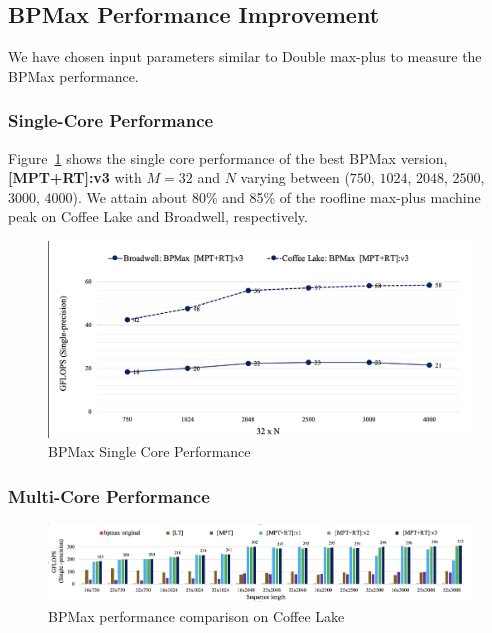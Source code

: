 \subsection{BPMax Performance Improvement}
We have chosen input parameters similar to Double max-plus to measure the BPMax performance.

\subsubsection{Single-Core Performance}
Figure~\ref{fig:st_performance_analysis_bpmax} shows the single core performance of the best BPMax version, \textbf{[MPT+RT]:v3} with $M=32$ and $N$ varying between ($750$, $1024$, $2048$, $2500$, $3000$, $4000$). We attain about 80\% and 85\% of the roofline max-plus machine peak on Coffee Lake and Broadwell, respectively.
\begin{figure}[htbp]
\centerline{\includegraphics[scale=0.38, trim=5 5 5 5,clip]{content/figures/bpmax_single_core.png}}
\caption{BPMax Single Core Performance}
\label{fig:st_performance_analysis_bpmax}
\end{figure}

\subsubsection{Multi-Core Performance}

\begin{figure}[htbp]
\centerline{\includegraphics[width=\textwidth,scale=1.00, trim=5 5 5 5,clip]{content/figures/bpm_performance_new_tile.png}} 
\caption{BPMax performance comparison on Coffee Lake}
\label{fig:bpm_performance}
\end{figure}


